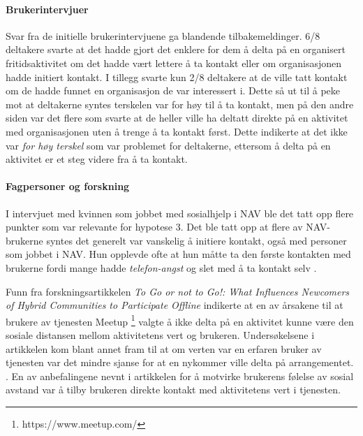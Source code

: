 \paragraph{Brukerintervjuer}
Svar fra de initielle brukerintervjuene ga blandende tilbakemeldinger. 6/8 deltakere svarte at det hadde gjort det enklere for dem å delta på en organisert fritidsaktivitet om det hadde vært lettere å ta kontakt eller om organisasjonen hadde initiert kontakt. I tillegg svarte kun 2/8 deltakere at de ville tatt kontakt om de hadde funnet en organisasjon de var interessert i. Dette så ut til å peke mot at deltakerne syntes terskelen var for høy til å ta kontakt, men på den andre siden var det flere som svarte at de heller ville ha deltatt direkte på en aktivitet med organisasjonen uten å trenge å ta kontakt først. Dette indikerte at det ikke var {\em for høy terskel} som var problemet for deltakerne, ettersom å delta på en aktivitet er et steg videre fra å ta kontakt.

\paragraph{Fagpersoner og forskning}
I intervjuet med kvinnen som jobbet med sosialhjelp i NAV ble det tatt opp flere punkter som var relevante for hypotese 3. Det ble tatt opp at flere av NAV-brukerne syntes det generelt var vanskelig å initiere kontakt, også med personer som jobbet i NAV. Hun opplevde ofte at hun måtte ta den første kontakten med brukerne fordi mange hadde {\em telefon-angst} og slet med å ta kontakt selv \cite{NAV-INTERVJU:16}.

Funn fra forskningsartikkelen {\em To Go or not to Go!: What Influences Newcomers of Hybrid Communities to Participate Offline} indikerte at en av årsakene til at brukere av tjenesten Meetup \footnote{https://www.meetup.com/} valgte å ikke delta på en aktivitet kunne være den sosiale distansen mellom aktivitetens vert og brukeren. Undersøkelsene i artikkelen kom blant annet fram til at om verten var en erfaren bruker av tjenesten var det mindre sjanse for at en nykommer ville delta på arrangementet. . En av anbefalingene nevnt i artikkelen for å motvirke brukerens følelse av sosial avstand var å tilby brukeren direkte kontakt med aktivitetens vert i tjenesten. \cite{NEWCOMERS:4:CT17}

